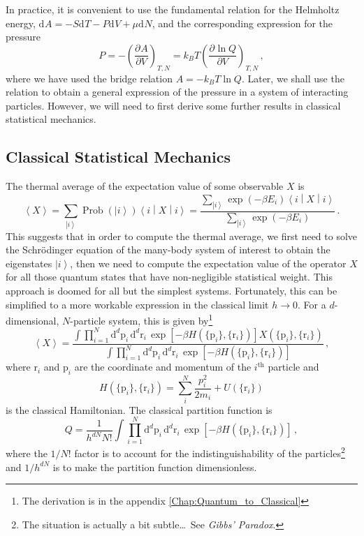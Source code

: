 \documentclass{article}
\theoremstyle{plain}\theoremheaderfont{\normalfont\bfseries}\theorembodyfont{\rmfamily}\theoremseparator{.}\newtheorem*{thm}{Theorem}\newtheorem*{law}{Law}\newtheorem*{pos}{Postulate}
\numberwithin{equation}{section}
\newcommand{\dd}[2][]{\mathrm{d}^{#1} #2\,}
\renewcommand{\d}[2][]{\mathrm{d}^{#1} #2}
\newcommand{\pdv}[3][]{\frac{\partial^{#1} #2}{{\partial #3}^{#1}}}
\newcommand{\ket}[1]{\left| #1 \right\rangle}
\newcommand{\eval}[1]{\left\langle #1 \right\rangle}
\newcommand{\expval}[2]{\left\langle #2 \middle| #1 \middle| #2 \right\rangle}
\newcommand{\vb}[1]{\bm{\mathrm{#1}}}
\DeclareMathOperator{\Prob}{Prob}
\begin{document}
    In practice, it is convenient to use the fundamental relation for the Helmholtz energy, \(\d{A}=-S\d{T}-P\d{V}+\mu\d{N}\), and the corresponding expression for the pressure
    \begin{equation}
        P=-\left(\pdv{A}{V}\right)_{T,N}=k_BT\left(\pdv{\ln Q}{V}\right)_{T,N}\,,
    \end{equation}
    where we have used the bridge relation \(A=-k_B T\ln Q\). Later, we shall use the relation to obtain a general expression of the pressure in a system of interacting particles. However, we will need to first derive some further results in classical statistical mechanics.
    \subsection{Classical Statistical Mechanics}
    The thermal average of the expectation value of some observable \(X\) is
    \begin{equation}
        \eval{X}=\sum_{\ket{i}}\Prob(\ket{i})\expval{X}{i}=\frac{\sum_{\ket{i}}\exp(-\beta E_i)\expval{X}{i}}{\sum_{\ket{i}}\exp(-\beta E_i)}\,.
    \end{equation}
    This suggests that in order to compute the thermal average, we first need to solve the Schr\"{o}dinger equation of the many-body system of interest to obtain the eigenstates \(\ket{i}\), then we need to compute the expectation value of the operator \(X\) for all those quantum states that have non-negligible statistical weight. This approach is doomed for all but the simplest systems. Fortunately, this can be simplified to a more workable expression in the classical limit \(h\to 0\). For a \(d\)-dimensional, \(N\)-particle system, this is given by\footnote{The derivation is in the appendix \cref{Chap:Quantum_to_Classical}}
    \begin{equation}
        \eval{X}=\frac{\int\prod_{i=1}^{N}\dd[d]{\vb{p}_i}\dd[d]{\vb{r}_i}\exp\left[-\beta H(\{\vb{p}_i\},\{\vb{r}_i\})\right]X(\{\vb{p}_i\},\{\vb{r}_i\})}{\int\prod_{i=1}^{N}\dd[d]{\vb{p}_i}\dd[d]{\vb{r}_i}\exp\left[-\beta H(\{\vb{p}_i\},\{\vb{r}_i\})\right]}\,,
    \end{equation}
    where \(\vb{r}_i\) and \(\vb{p}_i\) are the coordinate and momentum of the \(i^{\text{th}}\) particle and 
    \begin{equation}
        H(\{\vb{p}_i\},\{\vb{r}_i\})=\sum_{i}^{N}\frac{p_i^2}{2m_i} + U(\{\vb{r}_i\})
    \end{equation}
    is the classical Hamiltonian. The classical partition function is
    \begin{equation}
        Q=\frac{1}{h^{dN}N!}\int\prod_{i=1}^{N}\dd[d]{\vb{p}_i}\dd[d]{\vb{r}_i}\exp\left[-\beta H(\{\vb{p}_i\},\{\vb{r}_i\})\right]\,,
    \end{equation}
    where the \(1/N!\) factor is to account for the indistinguishability of the particles\footnote{The situation is actually a bit subtle\dots\ See \textit{Gibbs' Paradox}.} and \(1/h^{dN}\) is to make the partition function dimensionless.
\end{document}

